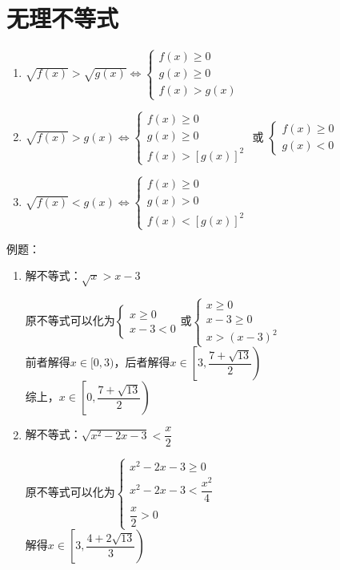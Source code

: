 \section*{无理不等式}
\begin{enumerate}
    \item $\sqrt{f(x)} > \sqrt{g(x)} \Longleftrightarrow \left\{ \begin{array}{l}
     f(x) \geq 0  \\
     g(x) \geq 0  \\
     f(x) > g(x)
\end{array}\right.$
    \item $\sqrt{f(x)} > g(x) \Longleftrightarrow \left\{ \begin{array}{l}
     f(x) \geq 0  \\
     g(x) \geq 0  \\
     f(x) > [g(x)]^2
\end{array}\right.$ 或 $\left\{ \begin{array}{l}
     f(x) \geq 0  \\
     g(x) < 0
\end{array}\right.$    
    \item $\sqrt{f(x)} < g(x) \Longleftrightarrow \left\{ \begin{array}{l}
     f(x) \geq 0  \\
     g(x) > 0  \\
     f(x) < [g(x)]^2
\end{array}\right.$
\end{enumerate}
例题：
\begin{enumerate}
    \item 解不等式：$\sqrt{x} > x-3$
    \begin{jieda}
        原不等式可以化为$\left\{ \begin{array}{l}
             x \geq 0  \\
             x - 3 < 0
        \end{array}\right.$或$\left\{ \begin{array}{l}
             x \geq 0  \\
             x - 3 \geq 0 \\ 
             x > (x-3)^2
        \end{array}\right.$ \\
        前者解得$x \in [0, 3)$，后者解得$x \in \left[3, \dfrac{7+\sqrt{13}}{2}\right)$ \\
        综上，$ x \in \left[0, \dfrac{7+\sqrt{13}}{2}\right)$
    \end{jieda}
    \item 解不等式：$\sqrt{x^2-2x-3} < \dfrac{x}{2}$
    \begin{jieda}
        原不等式可以化为$\left\{ \begin{array}{l}
             x^2-2x-3 \geq 0  \\
             x^2-2x-3 < \dfrac{x^2}{4}  \\
             \dfrac{x}{2} > 0
        \end{array}\right.$ \\
        解得$x \in \left[3, \dfrac{4+2\sqrt{13}}{3}\right)$ 
    \end{jieda}
\end{enumerate}
